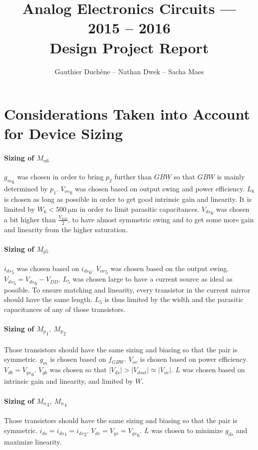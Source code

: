 \documentclass[english,11pt]{article}
\title{Analog Electronics Circuits --- 2015 -- 2016\\Design Project Report}
\author{Gauthier Duchêne -- Nathan Dwek -- Sacha Maes}
\begin{document}
\maketitle
\setcounter{section}{4}
\section{Considerations Taken into Account for Device Sizing}

\paragraph{Sizing of $M_{n6}$}
${g_m}_{6}$ was chosen in order to bring $p_{2}$ further than $GBW$ so that $GBW$ is mainly determined by $p_1$.
${V_{ov}}_{6}$ was chosen based on output swing and power efficiency.
$L_{6}$ is chosen as long as possible in order to get good intrinsic gain and linearity. It is limited by $W_{6} < \SI{500}{\micro\meter}$ in order to limit parasitic capacitances.
${V_{ds}}_6$ was chosen a bit higher than $\frac{V_{DD}}{2}$, to have almost symmetric swing and to get some more gain and linearity from the higher saturation.

\paragraph{Sizing of $M_{p5}$}
${i_{ds}}_5$ was chosen based on ${i_{ds}}_6$.
${V_{ov}}_5$ was chosen based on the output swing.
${V_{ds}}_5 = {V_{ds}}_6 - V_{DD}$.
$L_{5}$ was chosen large to have a current source as ideal as possible. To ensure matching and linearity, every transistor in the current mirror should have the same length. $L_{5}$ is thus limited by the width and the parasitic capacitances of any of those transistors.

\paragraph{Sizing of ${M_p}_{1},\:{M_p}_2$}
Those transistors should have the same sizing and biasing so that the pair is symmetric.
${g_m}$ is chosen based on $f_{GBW}$.
$V_{ov}$ is chosen based on power efficiency.
${V_{db}} = {V_{gs}}_6$.
$V_{gb}$ was chosen so that $|V_{ds}| > |V_{dsat}| \simeq |V_{ov}|$.
$L$ was chosen based on intrinsic gain and linearity, and limited by $W$.

\paragraph{Sizing of ${M_{n}}_3, \:{M_{n}}_4$}
Those transistors should have the same sizing and biasing so that the pair is symmetric.
${i_{ds}} = {i_{ds}}_1 = {i_{ds}}_2$.
${V_{ds}} = {V_{gs}} = {V_{gs}}_6$.
$L$ was chosen to minimize $g_{ds}$ and maximize linearity.
\end{document}
